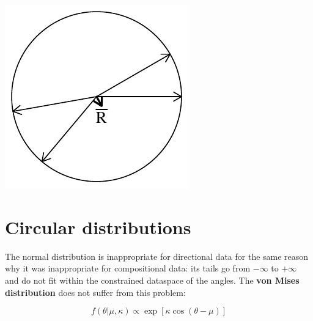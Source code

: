 \noindent\begin{minipage}[t][][b]{.2\textwidth}
\includegraphics[width=\textwidth]{../figures/lowconcentration.pdf}\\
\end{minipage}
\begin{minipage}[t][][t]{.8\textwidth}
  \label{fig:lowconcentration}
\end{minipage}

\section{Circular distributions}
\label{sec:circular-distributions}

The normal distribution is inappropriate for directional data for the
same reason why it was inappropriate for compositional data: its tails
go from $-\infty$ to $+\infty$ and do not fit within the constrained
dataspace of the angles. The \textbf{von Mises distribution} does not
suffer from this problem:

\begin{equation}
  f(\theta|\mu,\kappa) \propto \exp[\kappa \cos(\theta-\mu)]
  \label{eq:vonMises}
\end{equation}

